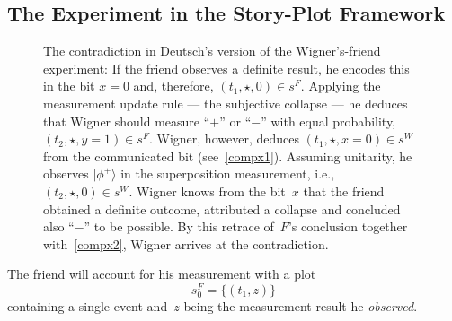\documentclass[aps,pra,twocolumn]{revtex4-1}
\newcommand{\ket}[1]{|#1 \rangle}
\theoremstyle{definition}
\theoremstyle{remark}
\begin{document}
\subsection{The Experiment in the Story-Plot Framework}
\begin{figure}
\centering
{}
\caption{The contradiction in Deutsch's version of the Wigner's-friend experiment: If the friend observes a definite result, he encodes this in the bit $x=0$ and, therefore, $(t_1,\star,0) \in s^F$. 
Applying the measurement update rule --- the subjective collapse --- he deduces that Wigner should measure ``$+$'' or ``$-$'' with equal probability, $(t_2, \star, y=1) \in s^F$. 
Wigner, however, deduces  $(t_1,\star,x=0) \in s^W$ from the communicated bit (see~\eqref{compx1}). 
Assuming unitarity, he observes $\ket{\phi^+}$ in the superposition measurement, i.e., $(t_2, \star, 0) \in s^W$. 
Wigner knows from the bit~$x$ that the friend obtained a definite outcome, attributed a collapse and concluded also ``$-$'' to be possible.
By this retrace of~$F$'s conclusion together with~\eqref{compx2}, Wigner arrives at the contradiction.}
\label{fig:WF-paradox}
\end{figure}
\noindent
The friend will account for his measurement with a plot
\begin{equation} \label{sfriend0}
s_0^F = \{ (t_1, z) \}
\end{equation}
containing a single event and~$z$ being the measurement result he \emph{observed}.
\end{document}
